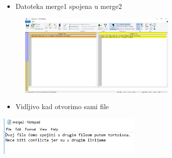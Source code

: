 \documentclass[10pt]{beamer}
\begin{document}
\begin{frame}
\begin{itemize}
    \item\small{Datoteka merge1 spojena u merge2}
\end{itemize}
\includegraphics[height=4cm, width=10cm]{tortoise2.png}\newline
\begin{itemize}
    \item\small{Vidljivo kad otvorimo sami file}
\end{itemize}
\includegraphics[width=7cm]{tortoise3.png}
\end{frame}

\end{document}
